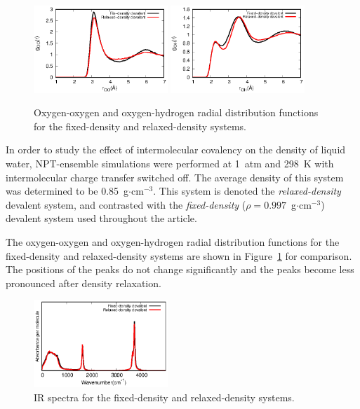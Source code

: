 \documentclass[10pt,amsmath,twocolumn,aps,prl,superscriptaddress,floatfix]{revtex4-1}
\begin{document}
\begin{figure}
\includegraphics[width=0.45\textwidth]{cp_rdf}
\includegraphics[width=0.45\textwidth]{cp_oh_rdf}
\caption{Oxygen-oxygen and oxygen-hydrogen radial distribution functions for the fixed-density and relaxed-density systems.}\label{Fig:rdf_cp}
\end{figure} 

In order to study the effect of intermolecular covalency on the density of liquid water, NPT-ensemble simulations were performed at 1~atm and 298~K with intermolecular charge transfer switched off. The average density of this system was determined to be 0.85~g$\cdot$cm$^{-3}$. 
This system is denoted the \emph{relaxed-density} devalent system, and contrasted with the \emph{fixed-density} ($\rho = 0.997$~g$\cdot$cm$^{-3}$) devalent system used throughout the article. 

The oxygen-oxygen and oxygen-hydrogen radial distribution functions for the fixed-density and relaxed-density systems are shown in Figure~\ref{Fig:rdf_cp} for comparison. 
The positions of the peaks do not change significantly and the peaks become less pronounced after density relaxation.

\begin{figure}
\includegraphics[width=0.45\textwidth]{cp_ir}
\caption{
IR spectra for the fixed-density and relaxed-density systems.}\label{Fig:ir_cp}
\end{figure} 
\end{document}
